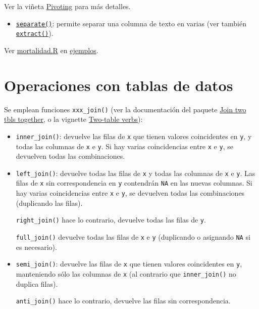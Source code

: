 \documentclass[
]{book}
\providecommand{\tightlist}{%
  \setlength{\itemsep}{0pt}\setlength{\parskip}{0pt}}
\theoremstyle{break}
\theoremstyle{nonumberplain}
\begin{document}
Ver la viñeta \href{https://tidyr.tidyverse.org/articles/pivot.html}{Pivoting} para más detalles.

\begin{itemize}
\tightlist
\item
  \href{https://tidyr.tidyverse.org/reference/separate.html}{\texttt{separate()}}: permite separar una columna de texto en varias (ver también \href{https://tidyr.tidyverse.org/reference/extract.html}{\texttt{extract()}}).
\end{itemize}

Ver \href{ejemplos/mortalidad/mortalidad.R}{mortalidad.R} en \href{https://github.com/rubenfcasal/book_notasr/tree/main/ejemplos}{ejemplos}.

\hypertarget{dplyr-join}{%
\section{Operaciones con tablas de datos}\label{dplyr-join}}

Se emplean funciones \texttt{xxx\_join()} (ver la documentación del paquete
\href{https://dplyr.tidyverse.org/reference/join.html}{Join two tbls together},
o la vignette \href{https://dplyr.tidyverse.org/articles/two-table.html}{Two-table verbs}):

\begin{itemize}
\item
  \texttt{inner\_join()}: devuelve las filas de \texttt{x} que tienen valores coincidentes en \texttt{y},
  y todas las columnas de \texttt{x} e \texttt{y}. Si hay varias coincidencias entre \texttt{x} e \texttt{y},
  se devuelven todas las combinaciones.
\item
  \texttt{left\_join()}: devuelve todas las filas de \texttt{x} y todas las columnas de \texttt{x} e \texttt{y}.
  Las filas de \texttt{x} sin correspondencia en \texttt{y} contendrán \texttt{NA} en las nuevas columnas.
  Si hay varias coincidencias entre \texttt{x} e \texttt{y}, se devuelven todas las combinaciones
  (duplicando las filas).

  \texttt{right\_join()} hace lo contrario, devuelve todas las filas de \texttt{y}.

  \texttt{full\_join()} devuelve todas las filas de \texttt{x} e \texttt{y} (duplicando o asignando \texttt{NA} si es necesario).
\item
  \texttt{semi\_join()}: devuelve las filas de \texttt{x} que tienen valores coincidentes en \texttt{y},
  manteniendo sólo las columnas de \texttt{x} (al contrario que \texttt{inner\_join()} no duplica filas).

  \texttt{anti\_join()} hace lo contrario, devuelve las filas sin correspondencia.
\end{itemize}
\end{document}

